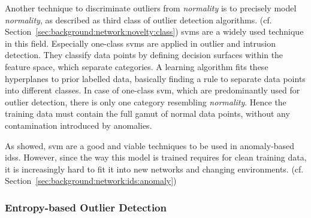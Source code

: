 Another technique to discriminate outliers from \emph{normality} is to precisely model \emph{normality}, as \textcite{Hodge2004} described as third class of outlier detection algorithms. (cf. Section~\ref{sec:background:network:novelty:class})
\glspl{svm} are a widely used technique in this field. Especially one-class \glspl{svm} are applied in outlier and intrusion detection. \parencite[cf.][]{Lazarevic2003,Eskin2002}
They classify data points by defining decision surfaces within the feature space, which separate categories. A learning algorithm fits these hyperplanes to prior labelled data, basically finding a rule to separate data points into different classes. 
In case of one-class \gls{svm}, which are predominantly used for outlier detection, there is only one category resembling \emph{normality}. Hence the training data must contain the full gamut of normal data points, without any contamination introduced by anomalies. \parencite[cf.][]{Muller2001,Scholkopf2001a}

As \textcite{Eskin2002,Lazarevic2003} showed, \gls{svm} are a good and viable techniques to be used in anomaly-based \glspl{ids}. However, since the way this model is trained requires for clean training data, it is increasingly hard to fit it into new networks and changing environments. (cf. Section~\ref{sec:background:network:ids:anomaly})

\subsubsection{Entropy-based Outlier Detection}
\label{sec:background:network:novelty:entropy}

